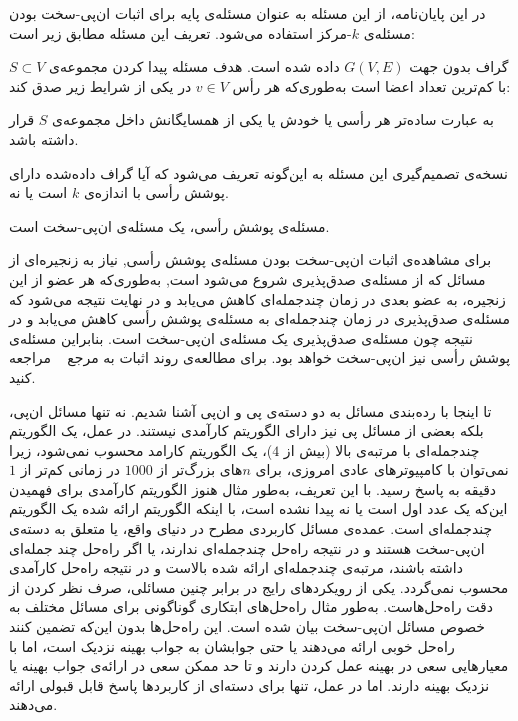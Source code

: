 در این پایان‌نامه، از این مسئله به عنوان مسئله‌ی پایه برای اثبات ان‌پی-سخت بودن مسئله‌ی $k$-مرکز استفاده می‌شود. تعریف این مسئله مطابق زیر است:


گراف بدون جهت $G(V, E)$ داده شده است. هدف مسئله پیدا کردن مجموعه‌ی $S \subset V$ با کم‌ترین تعداد اعضا است به‌طوری‌که هر رأس $v \in V$ در یکی از شرایط زیر صدق کند:





به عبارت ساده‌تر هر رأسی یا خودش یا یکی از همسایگانش داخل مجموعه‌ی $S$ قرار داشته باشد.

نسخه‌ی تصمیم‌گیری این مسئله به این‌گونه تعریف می‌شود که آیا گراف داده‌شده دارای پوشش رأسی با اندازه‌ی $k$ است یا نه.


مسئله‌ی پوشش رأسی، یک مسئله‌ی ان‌پی-سخت است.



برای مشاهده‌ی اثبات ان‌پی-سخت بودن مسئله‌ی پوشش رأسی, نیاز به زنجیره‌ای از مسائل که از مسئله‌ی صدق‌پذیری شروع می‌شود است, به‌طوری‌که هر عضو از این زنجیره، به عضو بعدی در زمان چندجمله‌ای کاهش می‌یابد و در نهایت نتیجه می‌شود که مسئله‌ی صدق‌پذیری در زمان چندجمله‌ای به مسئله‌ی پوشش رأسی کاهش می‌یابد و در نتیجه چون مسئله‌ی صدق‌پذیری یک مسئله‌ی ان‌پی-سخت است.
بنابراین مسئله‌ی پوشش رأسی نیز ان‌پی-سخت خواهد بود. برای مطالعه‌ی روند اثبات به مرجع ~ مراجعه کنید. 



تا اینجا با رده‌بندی مسائل به دو دسته‌ی پی و ان‌پی آشنا شدیم.
نه تنها مسائل ان‌پی، بلکه بعضی از مسائل پی نیز دارای الگوریتم کارآمدی نیستند.
در عمل، یک الگوریتم چندجمله‌ای با مرتبه‌ی بالا (بیش از $4$)، یک الگوریتم کارامد محسوب نمی‌شود، زیرا نمی‌توان با کامپیوتر‌های عادی امروزی، برای $n$های بزرگ‌تر از $1000$ در زمانی کم‌تر از $1$ دقیقه به پاسخ رسید.
با این تعریف، به‌طور مثال هنوز الگوریتم کارآمدی برای فهمیدن این‌که یک عدد اول است یا نه پیدا نشده است، با اینکه الگوریتم ارائه شده یک الگوریتم چندجمله‌ای است.
عمده‌ی مسائل کاربردی مطرح در دنیای واقع، یا متعلق به دسته‌ی ان‌پی-سخت هستند و در نتیجه راه‌حل چندجمله‌ای ندارند، یا اگر راه‌حل چند جمله‌ای داشته باشند، مرتبه‌ی چندجمله‌ای ارائه شده بالاست و در نتیجه راه‌حل کارآمدی محسوب نمی‌گردد.
یکی از رویکردهای رایج در برابر چنین مسائلی، صرف نظر کردن از دقت راه‌حل‌هاست.
به‌طور مثال راه‌حل‌های ابتکاری گوناگونی برای مسائل مختلف به خصوص مسائل ان‌پی-سخت بیان شده است.
این راه‌حل‌ها بدون این‌که تضمین کنند راه‌حل خوبی ارائه می‌دهند یا حتی جوابشان به جواب بهینه نزدیک است، اما با معیارهایی سعی در بهینه عمل کردن دارند و تا حد ممکن سعی در ارائه‌ی جواب بهینه یا نزدیک بهینه دارند.
اما در عمل، تنها برای دسته‌ای از کاربردها پاسخ قابل قبولی ارائه می‌دهند. 

